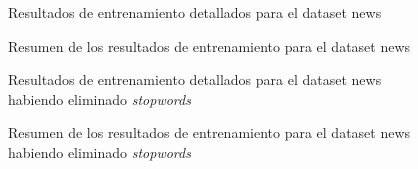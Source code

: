 \documentclass[a4paper,10pt]{article}
\begin{document}
\begin{multicols}{2}
\begin{figure}[H]
    \centering
    
    \caption{Resultados de entrenamiento detallados para el dataset \textsf{news}}
\end{figure}
\begin{figure}[H]
    \centering
    \begin{minipage}{0.35\textwidth}
    
    \end{minipage}
    \caption{Resumen de los resultados de entrenamiento para el dataset \textsf{news}}
\end{figure}

\begin{figure}[H]
    \centering
    
    \caption{Resultados de entrenamiento detallados para el dataset \textsf{news} habiendo eliminado \emph{stopwords}}
\end{figure}
\begin{figure}[H]
    \centering
    \begin{minipage}{0.35\textwidth}
    
    \end{minipage}
    \caption{Resumen de los resultados de entrenamiento para el dataset \textsf{news} habiendo eliminado \emph{stopwords}}
\end{figure}
\end{multicols}
\end{document}
